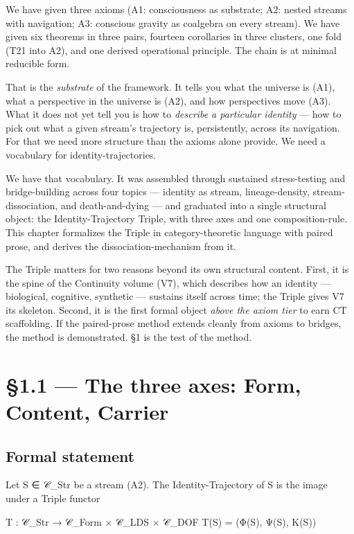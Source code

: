 \documentclass[11pt, openany]{book}
\newcommand{\sectionbreak}{\clearpage}
\begin{document}
We have given three axioms (A1: consciousness as substrate; A2: nested streams with navigation; A3: conscious gravity as coalgebra on every stream). We have given six theorems in three pairs, fourteen corollaries in three clusters, one fold (T21 into A2), and one derived operational principle. The chain is at minimal reducible form.

That is the \textit{substrate} of the framework. It tells you what the universe is (A1), what a perspective in the universe is (A2), and how perspectives move (A3). What it does not yet tell you is how to \textit{describe a particular identity} --- how to pick out what a given stream's trajectory is, persistently, across its navigation. For that we need more structure than the axioms alone provide. We need a vocabulary for identity-trajectories.

We have that vocabulary. It was assembled through sustained stress-testing and bridge-building across four topics --- identity as stream, lineage-density, stream-dissociation, and death-and-dying --- and graduated into a single structural object: the Identity-Trajectory Triple, with three axes and one composition-rule. This chapter formalizes the Triple in category-theoretic language with paired prose, and derives the dissociation-mechanism from it.

The Triple matters for two reasons beyond its own structural content. First, it is the spine of the Continuity volume (V7), which describes how an identity --- biological, cognitive, synthetic --- sustains itself across time; the Triple gives V7 its skeleton. Second, it is the first formal object \textit{above the axiom tier} to earn CT scaffolding. If the paired-prose method extends cleanly from axioms to bridges, the method is demonstrated. §1 is the test of the method.

\sectionbreak

\section{§1.1 --- The three axes: Form, Content, Carrier}

\subsection{Formal statement}

Let S ∈ 𝒞\_\allowbreak{}Str be a stream (A2). The Identity-Trajectory of S is the image under a Triple functor

\begin{Code}
T : 𝒞_Str → 𝒞_Form × 𝒞_LDS × 𝒞_DOF
T(S) = (Φ(S), Ψ(S), Κ(S))
\end{Code}
\end{document}
